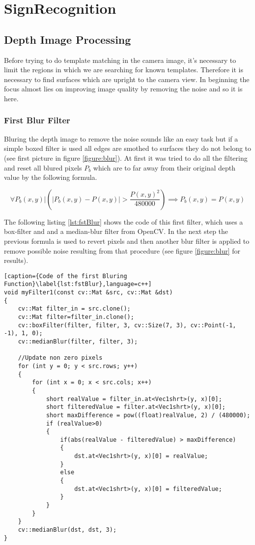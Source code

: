 \graphicspath{{./Software/img/}}
\chapter{SignRecognition}
 

\section{Depth Image Processing}
Before trying to do template matching in the camera image, it's necessary to limit the regions in which we are
searching for known templates. Therefore it is necessary to find surfaces which are upright to the camera view.
In beginning the focus almost lies on improving image quality by removing the noise and so it is here.

\subsection{First Blur Filter}
Bluring the depth image to remove the noise sounds like an easy task but if a simple boxed filter is used 
all edges are smothed to surfaces they do not belong to (see first picture in figure \vref{figure:blur}).
At first it was tried to do all the filtering and reset all blured pixels $P_b$ which are to far away from their 
original depth value by the following formula.

\[
 \forall P_b(x,y)  |   \left(\left|{P_b(x,y)-P(x,y)}\right|>{\frac{P(x,y)^2}{480000}}\right)\implies P_b(x,y)=P(x,y)
\]

The following listing \vref{lst:fstBlur} shows the code of this first filter, which uses a box-filter and and a 
median-blur filter from OpenCV. In the next step the previous formula is used to revert pixels and 
then another blur filter is applied to remove possible noise resulting from that procedure 
(see figure \vref{figure:blur} for results).

\newpage

\begin{lstlisting}[caption={Code of the first Bluring Function}\label{lst:fstBlur},language=c++]
void myFilter1(const cv::Mat &src, cv::Mat &dst)
{
	cv::Mat filter_in = src.clone();
	cv::Mat filter=filter_in.clone();
	cv::boxFilter(filter, filter, 3, cv::Size(7, 3), cv::Point(-1, -1), 1, 0);
	cv::medianBlur(filter, filter, 3);
	
	//Update non zero pixels
	for (int y = 0; y < src.rows; y++)
	{
		for (int x = 0; x < src.cols; x++)
		{
			short realValue = filter_in.at<Vec1shrt>(y, x)[0];
			short filteredValue = filter.at<Vec1shrt>(y, x)[0];
			short maxDifference = pow((float)realValue, 2) / (480000);
			if (realValue>0)
			{
				if(abs(realValue - filteredValue) > maxDifference)
				{
					dst.at<Vec1shrt>(y, x)[0] = realValue;
				}
				else
				{
					dst.at<Vec1shrt>(y, x)[0] = filteredValue;
				}
			}
		}
	}
	cv::medianBlur(dst, dst, 3);
}
\end{lstlisting}

